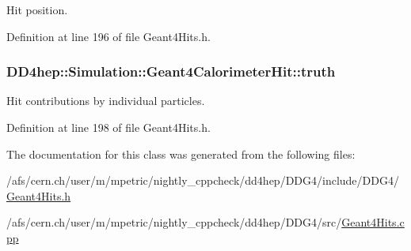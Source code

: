 Hit position. 

Definition at line 196 of file Geant4Hits.h.\hypertarget{class_d_d4hep_1_1_simulation_1_1_geant4_calorimeter_hit_a2db0ef9e8d6cfd29213269ccc8d53256}{
\subsubsection[{truth}]{ {\bf DD4hep::Simulation::Geant4CalorimeterHit::truth}}}
\label{class_d_d4hep_1_1_simulation_1_1_geant4_calorimeter_hit_a2db0ef9e8d6cfd29213269ccc8d53256}


Hit contributions by individual particles. 

Definition at line 198 of file Geant4Hits.h.

The documentation for this class was generated from the following files:\begin{DoxyCompactItemize}
\item 
/afs/cern.ch/user/m/mpetric/nightly\_\-cppcheck/dd4hep/DDG4/include/DDG4/\hyperlink{_geant4_hits_8h}{Geant4Hits.h}\item 
/afs/cern.ch/user/m/mpetric/nightly\_\-cppcheck/dd4hep/DDG4/src/\hyperlink{_geant4_hits_8cpp}{Geant4Hits.cpp}\end{DoxyCompactItemize}
